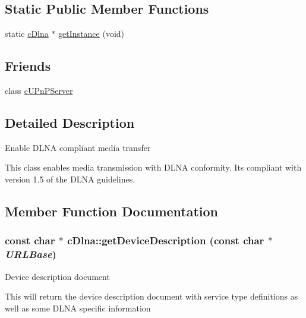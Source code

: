 \subsection*{Static Public Member Functions}
\begin{CompactItemize}
\item 
static \hyperlink{classcDlna}{cDlna} $\ast$ \hyperlink{classcDlna_1e30449831b903d508dae6640039fc25}{getInstance} (void)
\end{CompactItemize}
\subsection*{Friends}
\begin{CompactItemize}
\item 
\hypertarget{classcDlna_02ebb94fd2cdff4bfb2da3267446d62b}{
class \hyperlink{classcDlna_02ebb94fd2cdff4bfb2da3267446d62b}{cUPnPServer}}
\label{classcDlna_02ebb94fd2cdff4bfb2da3267446d62b}

\end{CompactItemize}


\subsection{Detailed Description}
Enable DLNA compliant media transfer

This class enables media transmission with DLNA conformity. Its compliant with version 1.5 of the DLNA guidelines. 

\subsection{Member Function Documentation}
\hypertarget{classcDlna_a7ae0cc7b651bc6ccd82ef5da527d09a}{
\subsubsection[{getDeviceDescription}]{\setlength{\rightskip}{0pt plus 5cm}const char $\ast$ cDlna::getDeviceDescription (const char $\ast$ {\em URLBase})}}
\label{classcDlna_a7ae0cc7b651bc6ccd82ef5da527d09a}


Device description document

This will return the device description document with service type definitions as well as some DLNA specific information

